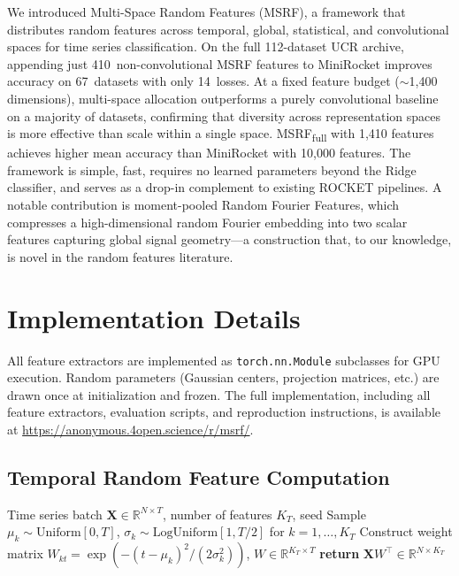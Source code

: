 \documentclass{article}
\begin{document}
We introduced Multi-Space Random Features (MSRF), a framework that distributes random features across temporal, global, statistical, and convolutional spaces for time series classification.
On the full 112-dataset UCR archive, appending just 410~non-convolutional MSRF features to MiniRocket improves accuracy on 67~datasets with only 14~losses.
At a fixed feature budget (${\sim}$1{,}400 dimensions), multi-space allocation outperforms a purely convolutional baseline on a majority of datasets, confirming that diversity across representation spaces is more effective than scale within a single space.
MSRF\textsubscript{full} with 1{,}410 features achieves higher mean accuracy than MiniRocket with 10{,}000 features.
The framework is simple, fast, requires no learned parameters beyond the Ridge classifier, and serves as a drop-in complement to existing ROCKET pipelines.
A notable contribution is moment-pooled Random Fourier Features, which compresses a high-dimensional random Fourier embedding into two scalar features capturing global signal geometry---a construction that, to our knowledge, is novel in the random features literature.






\newpage
\appendix
\section{Implementation Details}
\label{app:implementation}

All feature extractors are implemented as \texttt{torch.nn.Module} subclasses for GPU execution.
Random parameters (Gaussian centers, projection matrices, etc.) are drawn once at initialization and frozen.
The full implementation, including all feature extractors, evaluation scripts, and reproduction instructions, is available at \url{https://anonymous.4open.science/r/msrf/}.

\subsection{Temporal Random Feature Computation}

\begin{algorithmic}
\REQUIRE Time series batch $\mathbf{X} \in \mathbb{R}^{N \times T}$, number of features $K_T$, seed
\STATE Sample $\mu_k \sim \mathrm{Uniform}[0, T]$, $\sigma_k \sim \mathrm{LogUniform}[1, T/2]$ for $k = 1, \ldots, K_T$
\STATE Construct weight matrix $W_{kt} = \exp(-(t - \mu_k)^2 / (2\sigma_k^2))$, \quad $W \in \mathbb{R}^{K_T \times T}$
\STATE \textbf{return} $\mathbf{X} W^\top \in \mathbb{R}^{N \times K_T}$ 
\end{algorithmic}
\end{document}
